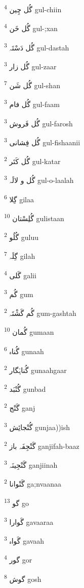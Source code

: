 \documentclass[12pt]{article}
\begin{document}
\begin{RTL}
\begin{multicols}{5}
{\ur گُل چِین}   \textsuperscript{4} gul-chiin

{\ur گُل خَن}   \textsuperscript{4} gul-;xan

{\ur گُل دَسْتَہ}   \textsuperscript{3} gul-dastah

{\ur گُل زار}   \textsuperscript{3} gul-zaar

{\ur گُل شَن}   \textsuperscript{7} gul-shan

{\ur گُل فام}   \textsuperscript{3} gul-faam

{\ur گُل فَروش}   \textsuperscript{3} gul-farosh

{\ur گُل فِشانی}   \textsuperscript{3} gul-fishaanii

{\ur گُل کَتَر}   \textsuperscript{2} gul-katar

{\ur گُل و لالَہ}   \textsuperscript{3} gul-o-laalah

{\ur گِلا}   \textsuperscript{6} gilaa

{\ur گُلِسْتان}   \textsuperscript{10} gulistaan

{\ur گُلُو}   \textsuperscript{2} guluu

{\ur گِلَہ}   \textsuperscript{7} gilah

{\ur گَلی}   \textsuperscript{4} galii

{\ur گُم}   \textsuperscript{3} gum

{\ur گُم گَشْتَہ}   \textsuperscript{2} gum-gashtah

{\ur گُمان}   \textsuperscript{10} gumaan

{\ur گُناہ}   \textsuperscript{6} gunaah

{\ur گُناہْگار}   \textsuperscript{2} gunaahgaar

{\ur گُنْبَد}   \textsuperscript{2} gunbad

{\ur گَنْج}   \textsuperscript{2} ganj

{\ur گُنْجائِش}   \textsuperscript{3} gunjaa))ish

{\ur گَنْجِفَہ باز}   \textsuperscript{2} ganjifah-baaz

{\ur گَنْجِینَہ}   \textsuperscript{3} ganjiinah

{\ur گَنْوانا}   \textsuperscript{2} ga;nvaanaa

{\ur گو}   \textsuperscript{13} go

{\ur گَوارا}   \textsuperscript{3} gavaaraa

{\ur گَواہ}   \textsuperscript{3} gavaah

{\ur گور}   \textsuperscript{4} gor

{\ur گوش}   \textsuperscript{8} gosh


\end{multicols}
\end{RTL}
\end{document}
